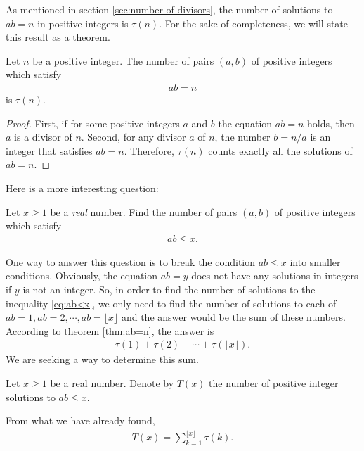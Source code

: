 \documentclass[12pt]{subfile}
\begin{document}
As mentioned in section \ref{sec:number-of-divisors}, the number of solutions to $ab = n$ in positive integers is $\tau(n)$. For the sake of completeness, we will state this result as a theorem.

	\begin{theorem}\label{thm:ab=n}
		Let $n$ be a positive integer. The number of pairs $(a,b)$ of positive integers which satisfy
			\begin{align*}
				ab = n
			\end{align*}
		is $\tau(n)$.
	\end{theorem}

	\begin{proof}
		First, if for some positive integers $a$ and $b$ the equation $ab = n$ holds, then $a$ is a divisor of $n$. Second, for any divisor $a$ of $n$, the number $b = n/a$ is an integer that satisfies $ab = n$. Therefore, $\tau(n)$ counts exactly all the solutions of $ab=n$.
	\end{proof}


Here is a more interesting question:

	\begin{question}
		Let $x \geq 1$ be a \textit{real} number. Find the number of pairs $(a, b)$ of positive integers which satisfy
			\begin{align}
				ab \leq x. \label{eq:ab<x}
			\end{align}
	\end{question}

One way to answer this question is to break the condition $ab \leq x$ into smaller conditions. Obviously, the equation $ab = y$ does not have any solutions in integers if $y$ is not an integer. So, in order to find the number of solutions to the inequality \ref{eq:ab<x}, we only need to find the number of solutions to each of $ab = 1, ab= 2, \cdots, ab= \lfloor x \rfloor$ and the answer would be the sum of these numbers. According to theorem \ref{thm:ab=n}, the answer is
	\begin{align*}
		\tau(1) + \tau(2) + \cdots + \tau(\lfloor x \rfloor).
	\end{align*}
We are seeking a way to determine this sum.

	\begin{definition}
		Let $x \geq 1$ be a real number. Denote by $T(x)$ the number of positive integer solutions to $ab \leq x$.
	\end{definition}

From what we have already found,
	\begin{align}
		T(x) = \sum_{k=1}^{\lfloor x \rfloor} \tau(k).\label{eq:T(x)-1}
	\end{align}
\end{document}
